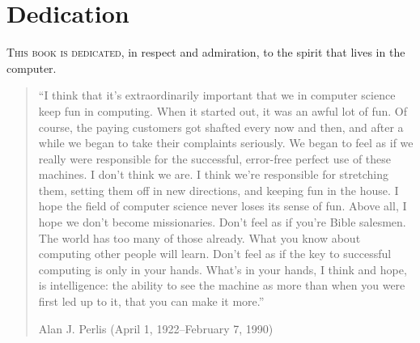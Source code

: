 \chapter*{Dedication}
\label{Dedication}

\lettrine{T}{his book is dedicated}, in respect and admiration, to the spirit that lives in
the computer.

\begin{quote}
“I think that it’s extraordinarily important that we in computer science keep
fun in computing.
When it started out, it was an awful lot of fun.
Of course, the paying customers got shafted every now and then, and after a while we began
to take their complaints seriously.
We began to feel as if we really were responsible for the successful, error-free perfect use of these machines.
I don’t think we are.
I think we’re responsible for stretching them, setting them off in new directions, and keeping fun in the house.
I hope the field of computer science never loses its sense of fun.
Above all, I hope we don’t become missionaries.
Don’t feel as if you’re Bible salesmen.
The world has too many of those already.
What you know about computing other people will learn.
Don’t feel as if the key to successful computing is only in your hands.
What’s in your hands, I think and hope, is intelligence:
the ability to see the machine as more than when you were first led up to it, that you can make it more.”
\begin{flushleft}
	Alan J. Perlis (April 1, 1922--February 7, 1990)
\end{flushleft}
\end{quote}
